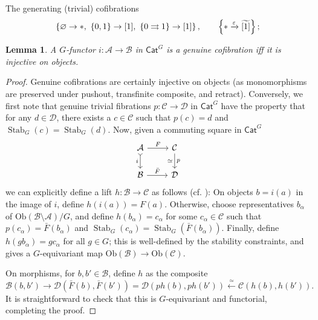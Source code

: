 \documentclass[a4paper,10pt
,draft
]{article}%
\numberwithin{equation}{section}
\numberwithin{figure}{section}
\newtheorem{lemma}[equation]{Lemma}%
\theoremstyle{definition} %
\newcommand{\set}[1]{\left\{#1\right\}}%
\newcommand{\longto}{\longrightarrow}%
\newcommand{\Cat}{\mathsf{Cat}}
\DeclareMathOperator{\Stab}{Stab}
\newcommand{\1}{\ensuremath{\mathbbm 1}}%
\begin{document}
The generating (trivial) cofibrations
\[
      \set{ \varnothing \to \**,\ \set{0,1} \to [1],\ \set{0 \rightrightarrows 1} \to [1] },
      \qquad
      \set{ \** \xrightarrow{\varepsilon} \widetilde{[1]} };
\]


\begin{lemma}
      \label{CATCOF_LEM}
      A $G$-functor $i \colon \mathcal A \to \mathcal B$ in $\Cat^G$
      is a genuine cofibration
      iff
      it is injective on objects.
\end{lemma}
\begin{proof}
      Genuine cofibrations are certainly injective on objects (as monomorphisms are preserved under pushout, transfinite composite, and retract).
      Conversely, we first note that genuine trivial fibrations $p \colon \mathcal C \to \mathcal D$ in $\Cat^G$ have the property that
      for any $d \in \mathcal D$, there exists a $c \in \mathcal C$ such that $p(c) = d$ and $\Stab_G(c) = \Stab_G(d)$.
      Now, given a commuting square in $\Cat^G$
      \[
            \begin{tikzcd}
                  \mathcal A \arrow[d, "i"', rightarrowtail] \arrow[r, "F"]
                  &
                  \mathcal C \arrow[d, "p", "\simeq"']
                  \\
                  \mathcal B \arrow[r, "\bar F"]
                  &
                  \mathcal D
            \end{tikzcd}
      \]
      we can explicitly define a lift $h \colon \mathcal B \to \mathcal C$ as follows (cf. \cite[proof of Thm. 6.7]{Str00}):
      On objects $b = i(a)$ in the image of $i$, define $h(i(a)) = F(a)$.
      Otherwise, choose representatives $b_\alpha$ of $\mathrm{Ob}(\mathcal B \setminus \mathcal A)/G$,
      and define $h(b_\alpha) = c_\alpha$ for some $c_\alpha \in \mathcal C$ such that
      $p(c_\alpha) = \bar F(b_\alpha)$ and $\Stab_G(c_\alpha) = \Stab_G(\bar F(b_\alpha))$.
      Finally, define $h(g b_\alpha) = g c_\alpha$ for all $g \in G$; this is well-defined by the stability constraints,
      and gives a $G$-equivariant map $\mathrm{Ob}(\mathcal B) \to \mathrm{Ob}(\mathcal C)$.

      On morphisms, for $b,b' \in \mathcal B$, define $h$ as the composite
      \[
            \mathcal B(b,b') \longto
            \mathcal D(\bar F(b), \bar F(b')) = \mathcal D(ph(b),ph(b')) \xleftarrow{\simeq}
            \mathcal C(h(b), h(b')).
      \]
      It is straightforward to check that this is $G$-equivariant and functorial,
      completing the proof.
\end{proof}
\end{document}
